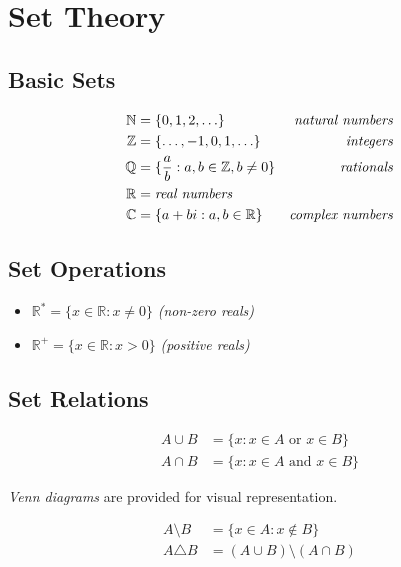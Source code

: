 \documentclass[12pt,a4paper]{article}
\begin{document}
\section{Set Theory}

\subsection{Basic Sets}

\begin{align*}
\mathbb{N} &= \{0, 1, 2, \ldots\} & \text{\textit{natural numbers}} \\
\mathbb{Z} &= \{\ldots, -1, 0, 1, \ldots\} & \text{\textit{integers}} \\
\mathbb{Q} &= \{\frac{a}{b} : a, b \in \mathbb{Z}, b \neq 0\} & \text{\textit{rationals}} \\
\mathbb{R} &= \text{\textit{real numbers}} \\
\mathbb{C} &= \{a + bi : a, b \in \mathbb{R}\} & \text{\textit{complex numbers}}
\end{align*}

\subsection{Set Operations}

\begin{itemize}
\item $\mathbb{R}^* = \{x \in \mathbb{R} : x \neq 0\}$ \textit{(non-zero reals)}
\item $\mathbb{R}^+ = \{x \in \mathbb{R} : x > 0\}$ \textit{(positive reals)}
\end{itemize}

\subsection{Set Relations}

\begin{align*}
A \cup B &= \{x : x \in A \text{ or } x \in B\} \\
A \cap B &= \{x : x \in A \text{ and } x \in B\}
\end{align*}

\textit{Venn diagrams} are provided for visual representation.

\begin{align*}
A \setminus B &= \{x \in A : x \notin B\} \\
A \triangle B &= (A \cup B) \setminus (A \cap B)
\end{align*}
\end{document}
